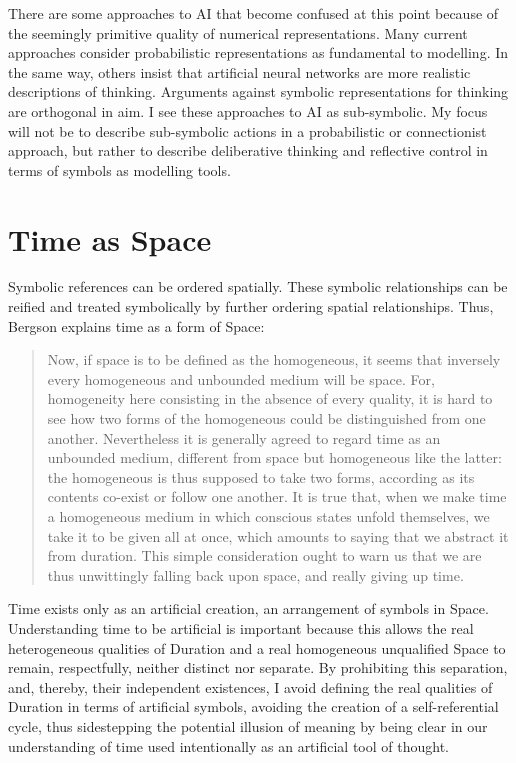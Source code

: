 There are some approaches to AI that become confused at this point
because of the seemingly primitive quality of numerical
representations.  Many current approaches consider probabilistic
representations as fundamental to modelling.  In the same way, others
insist that artificial neural networks are more realistic descriptions
of thinking.  Arguments against symbolic representations for thinking
are orthogonal in aim.  I see these approaches to AI as sub-symbolic.
My focus will not be to describe sub-symbolic actions in a
probabilistic or connectionist approach, but rather to describe
deliberative thinking and reflective control in terms of symbols as
modelling tools.

\section{Time as Space}

Symbolic references can be ordered spatially.  These symbolic
relationships can be reified and treated symbolically by further
ordering spatial relationships.  Thus, Bergson explains time as a form
of Space:

\begin{quote}
Now, if space is to be defined as the homogeneous, it seems that
inversely every homogeneous and unbounded medium will be space.  For,
homogeneity here consisting in the absence of every quality, it is
hard to see how two forms of the homogeneous could be distinguished
from one another.  Nevertheless it is generally agreed to regard time
as an unbounded medium, different from space but homogeneous like the
latter: the homogeneous is thus supposed to take two forms, according
as its contents co-exist or follow one another.  It is true that, when
we make time a homogeneous medium in which conscious states unfold
themselves, we take it to be given all at once, which amounts to
saying that we abstract it from duration.  This simple consideration
ought to warn us that we are thus unwittingly falling back upon space,
and really giving up time.
\end{quote}

Time exists only as an artificial creation, an arrangement of symbols
in Space.  Understanding time to be artificial is important because
this allows the real heterogeneous qualities of Duration and a real
homogeneous unqualified Space to remain, respectfully, neither
distinct nor separate.  By prohibiting this separation, and, thereby,
their independent existences, I avoid defining the real qualities of
Duration in terms of artificial symbols, avoiding the creation of a
self-referential cycle, thus sidestepping the potential illusion of
meaning by being clear in our understanding of time used intentionally
as an artificial tool of thought.

